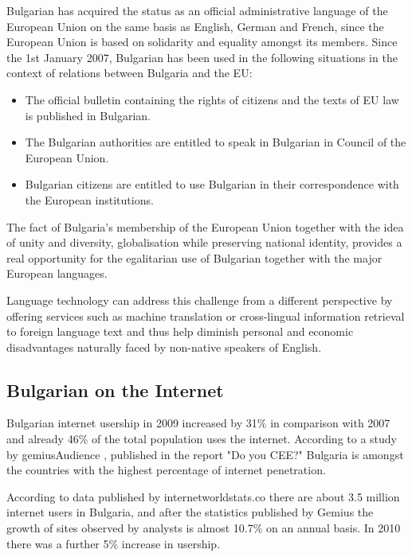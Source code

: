 \documentclass[]{../../metanetpaper}
\begin{document}
\begin{multicols}{2}
Bulgarian has acquired the status as an official administrative language of the European Union on the same basis as English, German and French, since the European Union is based on solidarity and equality amongst its members. Since the 1st January 2007, Bulgarian has been used in the following situations in the context of relations between Bulgaria and the EU:

\begin{itemize}
\item The official bulletin containing the rights of citizens and the texts of EU law is published in Bulgarian.
\item The Bulgarian authorities are entitled to speak in Bulgarian in Council of the European Union.
\item Bulgarian citizens are entitled to use Bulgarian in their correspondence with the European institutions.
\end{itemize}

The fact of Bulgaria’s membership of the European Union together with the idea of unity and diversity, globalisation while preserving national identity, provides a real opportunity for the egalitarian use of Bulgarian together with the major European languages.

Language technology can address this challenge from a different perspective by offering services such as machine translation or cross-lingual information retrieval to foreign language text and thus help diminish personal and economic disadvantages naturally faced by non-native speakers of English.


\subsection{Bulgarian on the Internet}

Bulgarian internet usership in 2009 increased by 31\% in comparison with 2007 and already 46\% of the total population uses the internet. According to a study by gemiusAudience \cite{gemius}, published in the report "Do you CEE?" \cite{inetcee} Bulgaria is amongst the countries with the highest percentage of internet penetration.

According to data published by internetworldstats.co \cite{inetworldstat} there are about 3.5 million internet users in Bulgaria, and after the statistics published by Gemius the growth of sites observed by analysts is almost 10.7\% on an annual basis. In 2010 there was a further 5\% increase in usership.


\end{multicols}
\end{document}

